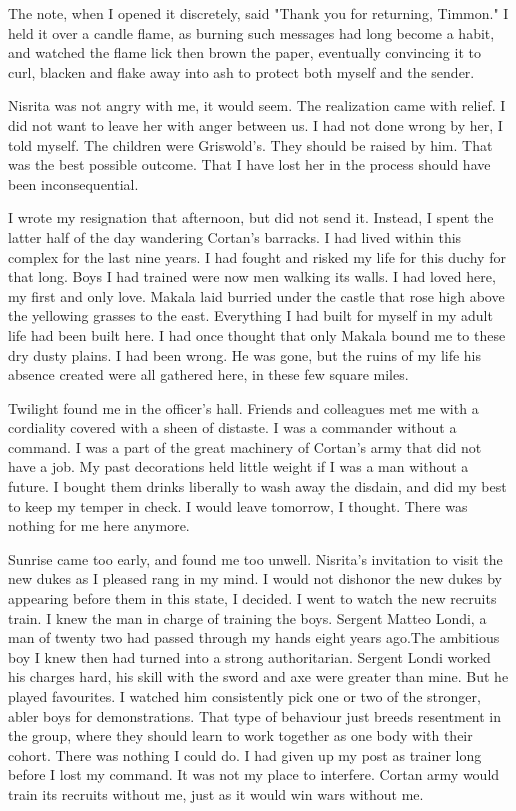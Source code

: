 \documentclass{article}
\begin{document}
The note, when I opened it discretely, said "Thank you for returning, Timmon." I held it over a candle flame, as burning such messages had long become a habit, and watched the flame lick then brown the paper, eventually convincing it to curl, blacken and flake away into ash to protect both myself and the sender.

Nisrita was not angry with me, it would seem. The realization came with relief. I did not want to leave her with anger between us. I had not done wrong by her, I told myself. The children were Griswold's. They should be raised by him. That was the best possible outcome. That I have lost her in the process should have been inconsequential.

\vspace{.5cm}

I wrote my resignation that afternoon, but did not send it. Instead, I spent the latter half of the day wandering Cortan's barracks. I had lived within this complex for the last nine years. I had fought and risked my life for this duchy for that long. Boys I had trained were now men walking its walls. I had loved here, my first and only love. Makala laid burried under the castle that rose high above the yellowing grasses to the east. Everything I had built for myself in my adult life had been built here. I had once thought that only Makala bound me to these dry dusty plains. I had been wrong. He was gone, but the ruins of my life his absence created were all gathered here, in these few square miles.

Twilight found me in the officer's hall. Friends and colleagues met me with a cordiality covered with a sheen of distaste. I was a commander without a command. I was a part of the great machinery of Cortan's army that did not have a job. My past decorations held little weight if I was a man without a future. I bought them drinks liberally to wash away the disdain, and did my best to keep my temper in check. I would leave tomorrow, I thought. There was nothing for me here anymore. 

Sunrise came too early, and found me too unwell. Nisrita's invitation to visit the new dukes as I pleased rang in my mind. I would not dishonor the new dukes by appearing before them in this state, I decided. I went to watch the new recruits train. I knew the man in charge of training the boys. Sergent Matteo Londi, a man of twenty two had passed through my hands eight years ago.The ambitious boy I knew then had turned into a strong authoritarian. Sergent Londi worked his charges hard, his skill with the sword and axe were greater than mine. But he played favourites. I watched him consistently pick one or two of the stronger, abler boys for demonstrations. That type of behaviour just breeds resentment in the group, where they should learn to work together as one body with their cohort. There was nothing I could do. I had given up my post as trainer long before I lost my command. It was not my place to interfere. Cortan army would train its recruits without me, just as it would win wars without me.
\end{document}

